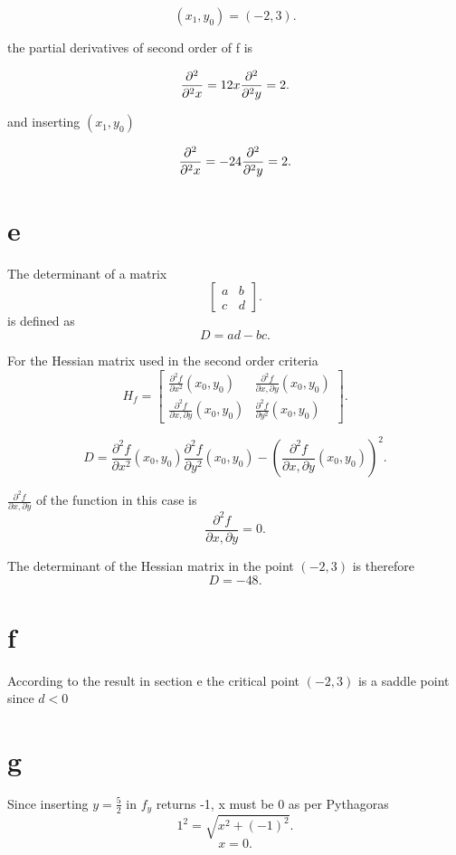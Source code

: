 \documentclass[12pt,a4paper]{article}
\begin{document}
\[
	(x_1,y_0)=(-2,3)
.\] 

the partial derivatives of second order of f is


\[
\frac{\partial^2 }{\partial^2 x}=12x\\\frac{\partial^2 }{\partial^2 y} = 2 
.\] 

and inserting $(x_1,y_0)$ 

\[
\frac{\partial^2 }{\partial^2 x} =-24\\\frac{\partial^2 }{\partial^2 y} =2
.\] 


\section{e} 

The determinant of a matrix 
\[
\begin{bmatrix}
	 a & b \\ c & d 
\end{bmatrix}
.\] 
is defined as
\[
D=ad-bc
.\] 

For the Hessian matrix used in the second order criteria
\[
	H_{f}=\begin{bmatrix}  \frac{\partial^2f}{\partial x^2}(x_0,y_0) & \frac{\partial^2f}{\partial x,\partial y}(x_0,y_0)\\\frac{\partial^2 f}{\partial x, \partial y}(x_0,y_0) & \frac{\partial^2 f}{\partial y^2}(x_0,y_0) \end{bmatrix} 
.\] 

\[
	D=\frac{\partial^2f}{\partial x^2}(x_0,y_0)\frac{\partial^2 f}{\partial y^2}(x_0,y_0)-\left( \frac{\partial^2f}{\partial x,\partial y}(x_0,y_0) \right) ^2
.\] 

 $\frac{\partial^2f}{\partial x,\partial y} $ of the function in this case is \[
 \frac{\partial^2f}{\partial x,\partial y} = 0
 .\] 

 The determinant of the Hessian matrix in the point $(-2,3)$ is therefore
  \[
 D=-48
 .\] 

\section{f}

According to the result in section e the critical point $(-2,3)$ is a saddle point since  $d<0$

\section{g} 

Since inserting $y=\frac{5}{2}$ in $f_{y}$ returns -1, x must be 0 as per Pythagoras
\[
	1^2=\sqrt{x^2+(-1)^2} 
.\] 
\[
	x=0 
.\] 
\end{document}
